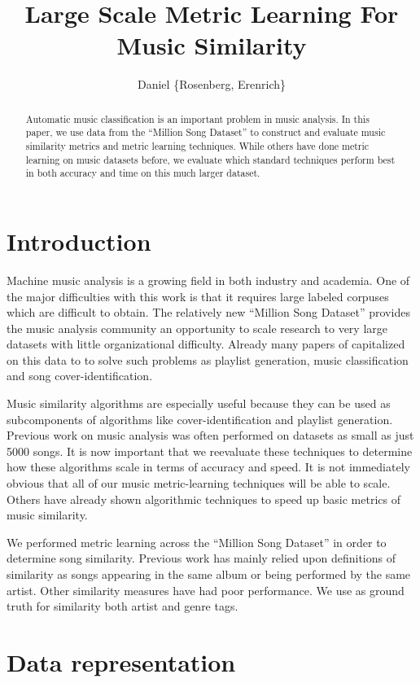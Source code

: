 \documentclass[a4paper,10pt]{article}
\title{Large Scale Metric Learning For Music Similarity}
\author{Daniel \{Rosenberg, Erenrich\} }
\begin{document}
\maketitle

\begin{abstract}
Automatic music classification is an important problem in music analysis. In this paper, we use data from the ``Million Song Dataset'' to construct and evaluate music similarity metrics and metric learning techniques. While others have done metric learning on music datasets before, we evaluate which standard techniques perform best in both accuracy and time on this much larger dataset.
\end{abstract}

\section{Introduction}
Machine music analysis is a growing field in both industry and academia. One of the major difficulties with this work is that it requires large labeled corpuses which are difficult to obtain. The relatively new ``Million Song Dataset'' provides the music analysis community an opportunity to scale research to very large datasets with little organizational difficulty\cite{Bertin-Mahieux2011}. Already many papers of capitalized on this data to to solve such problems as playlist generation\cite{mcfee2011_nlp}, music classification and song cover-identification\cite{Bertin-Mahieux2011b}. 

Music similarity algorithms are especially useful because they can be used as subcomponents of algorithms like cover-identification and playlist generation. Previous work on music analysis was often performed on datasets as small as just 5000 songs\cite{Slaney_learninga}. It is now important that we reevaluate these techniques to determine how these algorithms scale in terms of accuracy and speed. It is not immediately obvious that all of our music metric-learning techniques will be able to scale. Others have already shown algorithmic techniques to speed up basic metrics of music similarity\cite{mcfee2011_sim}.

We performed metric learning across the ``Million Song Dataset'' in order to determine song similarity. Previous work has mainly relied upon definitions of similarity as songs appearing in the same album or being performed by the same artist. Other similarity measures have had poor performance. We use as ground truth for similarity both artist and genre tags.
\section{Data representation}
\end{document}
